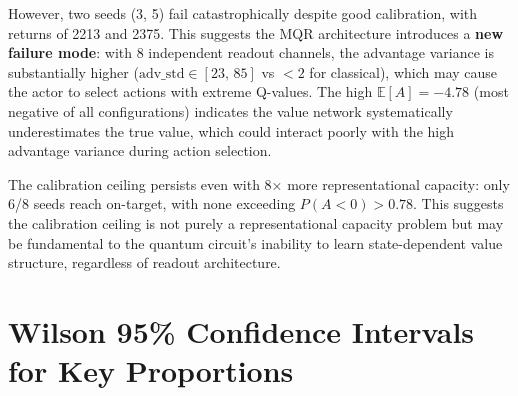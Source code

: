 \documentclass[10pt,a4paper]{article}
\begin{document}
However, two seeds (3, 5) fail catastrophically despite good calibration,
with returns of 2213 and 2375. This suggests the MQR architecture introduces
a \textbf{new failure mode}: with 8 independent readout channels, the advantage
variance is substantially higher ($\text{adv\_std}\in[23,\,85]$ vs $<2$ for classical),
which may cause the actor to select actions with extreme Q-values. The high
$\mathbb{E}[A] = -4.78$ (most negative of all configurations) indicates the
value network systematically underestimates the true value, which could interact
poorly with the high advantage variance during action selection.

The calibration ceiling persists even with 8× more representational capacity:
only 6/8 seeds reach on-target, with none exceeding $P(A<0)>0.78$. This suggests
the calibration ceiling is not purely a representational capacity problem but
may be fundamental to the quantum circuit's inability to learn state-dependent
value structure, regardless of readout architecture.

\section{Wilson 95\% Confidence Intervals for Key Proportions}
\end{document}
